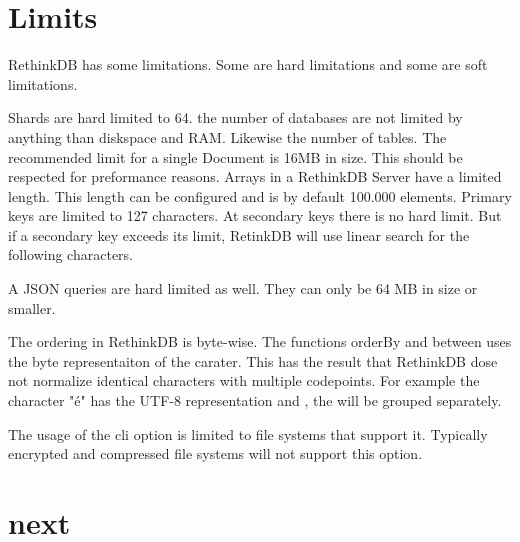 \section{Limits}


RethinkDB has some limitations. Some are hard limitations and some are soft limitations.
\cite{RethinkLimits}


Shards are hard limited to 64. the number of databases are not limited by anything than diskspace and RAM. Likewise the number of tables. The recommended limit for a single Document is 16MB in size. This should be respected for preformance reasons. Arrays in a RethinkDB Server have a limited length. This length can be configured and is by default 100.000 elements. Primary keys are limited to 127 characters. At secondary keys there is no hard limit. But if a secondary key exceeds its limit, RetinkDB will use linear search for the following characters.

A JSON queries are hard limited as well. They can only be 64 MB in size or smaller.

The ordering in RethinkDB is byte-wise. The functions orderBy and between uses the byte representaiton of the carater. This has the result that RethinkDB dose not normalize identical characters with multiple codepoints. For example the character "é" has the UTF-8 representation  and , the will be grouped separately.

The usage of the cli option  is limited to file systems that support it. Typically encrypted and compressed file systems will not support this option.

\section{next}
